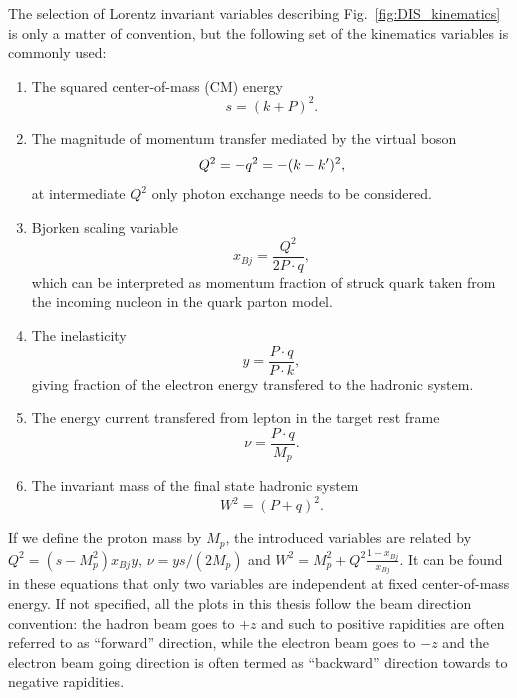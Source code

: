 The selection of Lorentz invariant variables describing
Fig.~\ref{fig:DIS_kinematics} is only a matter of convention, but the following
set of the kinematics variables is commonly used:
\begin{enumerate}
\item The squared center-of-mass (CM) energy
\begin{equation}
	s = (k+P)^{2}.
\end{equation}

\item The magnitude of momentum transfer mediated by the virtual boson
\begin{equation}
Q^{2} = -q^{2} = -(k-k^{\prime})^{2},
\end{equation}
at intermediate $Q^{2}$ only photon exchange needs to be considered.

\item Bjorken scaling variable
\begin{equation}
x_{Bj} = \frac{Q^{2}}{2P\cdot q},
\end{equation}
which can be interpreted as momentum fraction of
struck quark taken from the incoming nucleon in the quark parton model.

\item The inelasticity
\begin{equation}
y = \frac{P\cdot q}{ P\cdot k},
\end{equation}
giving fraction of the electron energy transfered to
the hadronic system.

\item The energy current transfered from lepton in the target rest frame
\begin{equation}
\nu = \frac{P\cdot q}{ M_{p} }.
\end{equation}

\item The invariant mass of the final state hadronic system
\begin{equation}
W^{2} = (P+q)^{2}.
\end{equation}

\end{enumerate}

If we define the proton mass by $M_{p}$, the introduced variables are related by
$Q^{2}=(s-M^{2}_{p})x_{Bj}y$, $\nu = ys/(2M_{p})$ and
$W^{2}=M^{2}_{p}+Q^{2}\frac{1-x_{Bj}}{x_{Bj}}$. It can be found in these
equations that only two variables are independent at fixed center-of-mass
energy. If not specified, all the plots in this thesis follow the beam direction
convention: the hadron beam goes to $+z$ and such to positive rapidities are
often referred to as ``forward'' direction, while the electron beam goes to $-z$
and the electron beam going direction is often termed as ``backward'' direction
towards to negative rapidities.



